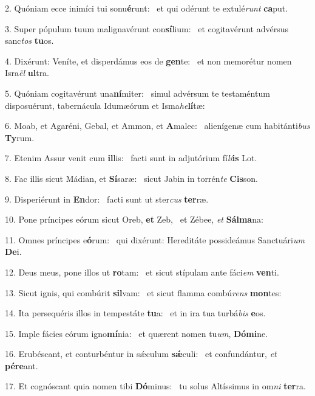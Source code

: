 2. Quóniam ecce inimíci tui sonu\textbf{é}runt: \ast\  et qui odérunt te extulé\textit{runt} \textbf{ca}put.\

3. Super pópulum tuum malignavérunt con\textbf{sí}lium: \ast\  et cogitavérunt advérsus sanc\textit{tos} \textbf{tu}os.\

4. Dixérunt: Veníte, et disperdámus eos de \textbf{gen}te: \ast\  et non memorétur nomen Isra\textit{ël} \textbf{ul}tra.\

5. Quóniam cogitavérunt una\textbf{ní}miter: \ast\  simul advérsum te testaméntum disposuérunt, tabernácula Idumæórum et Isma\textit{he}\textbf{lí}tæ:\

6. Moab, et Agaréni, Gebal, et Ammon, et \textbf{A}malec: \ast\  alienígenæ cum habitánti\textit{bus} \textbf{Ty}rum.\

7. Etenim Assur venit cum \textbf{il}lis: \ast\  facti sunt in adjutórium fí\textit{li}\textbf{is} Lot.\

8. Fac illis sicut Mádian, et \textbf{Sí}saræ: \ast\  sicut Jabin in torrén\textit{te} \textbf{Cis}son.\

9. Disperiérunt in \textbf{En}dor: \ast\  facti sunt ut ster\textit{cus} \textbf{ter}ræ.\

10. Pone príncipes eórum sicut Oreb, \textbf{et} Zeb, \ast\  et Zébee, \textit{et} \textbf{Sál}\textbf{ma}na:\

11. Omnes príncipes e\textbf{ó}rum: \ast\  qui dixérunt: Hereditáte possideámus Sanctuári\textit{um} \textbf{De}i.\

12. Deus meus, pone illos ut \textbf{ro}tam: \ast\  et sicut stípulam ante fáci\textit{em} \textbf{ven}ti.\

13. Sicut ignis, qui combúrit \textbf{sil}vam: \ast\  et sicut flamma combú\textit{rens} \textbf{mon}tes:\

14. Ita persequéris illos in tempestáte \textbf{tu}a: \ast\  et in ira tua turbá\textit{bis} \textbf{e}os.\

15. Imple fácies eórum igno\textbf{mí}nia: \ast\  et quærent nomen tu\textit{um}, \textbf{Dó}\textbf{mi}ne.\

16. Erubéscant, et conturbéntur in sǽculum \textbf{sǽ}culi: \ast\  et confundántur, \textit{et} \textbf{pér}\textbf{e}ant.\

17. Et cognóscant quia nomen tibi \textbf{Dó}minus: \ast\  tu solus Altíssimus in om\textit{ni} \textbf{ter}ra.\

